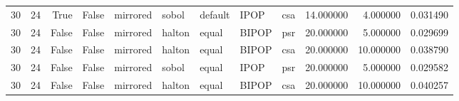 \begin{tabular}{rrrrlllllrrr}
30 & 24 & True & False & mirrored & sobol & default & IPOP & csa & 14.000000 & 4.000000 & 0.031490 \\
30 & 24 & False & False & mirrored & halton & equal & BIPOP & psr & 20.000000 & 5.000000 & 0.029699 \\
30 & 24 & False & False & mirrored & halton & equal & BIPOP & csa & 20.000000 & 10.000000 & 0.038790 \\
30 & 24 & False & False & mirrored & sobol & equal & IPOP & psr & 20.000000 & 5.000000 & 0.029582 \\
30 & 24 & False & False & mirrored & halton & equal & BIPOP & csa & 20.000000 & 10.000000 & 0.040257 \\
\bottomrule
\end{tabular}
